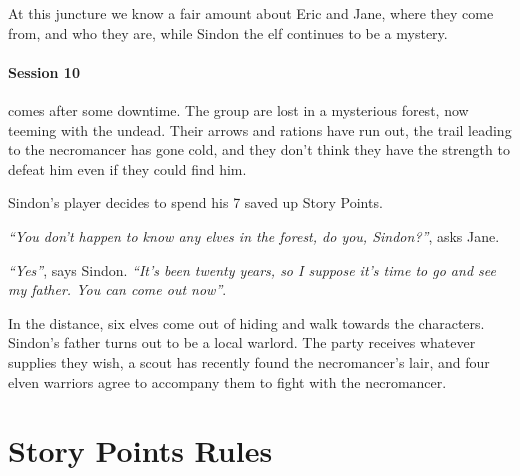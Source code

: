 \documentclass[titlepage,a4paper,openany]{book}
\begin{document}
\begin{multicols}{2}
At this juncture we know a fair amount about Eric and Jane, where they come from, and who they are, while Sindon the elf continues to be a mystery.

\paragraph{Session 10} comes after some downtime.  The group are lost in a mysterious forest, now teeming with the undead.  Their arrows and rations have run out, the trail leading to the necromancer has gone cold, and they don't think they have the strength to defeat him even if they could find him.

Sindon's player decides to spend his 7 saved up Story Points.

\textit{``You don't happen to know any elves in the forest, do you, Sindon?''}, asks Jane.

\textit{``Yes''}, says Sindon.  \textit{``It's been twenty years, so I suppose it's time to go and see my father.  You can come out now''}.

In the distance, six elves come out of hiding and walk towards the characters.  Sindon's father turns out to be a local warlord.  The party receives whatever supplies they wish, a scout has recently found the necromancer's lair, and four elven warriors agree to accompany them to fight with the necromancer.

\end{multicols}

\section{Story Points Rules}
\end{document}
